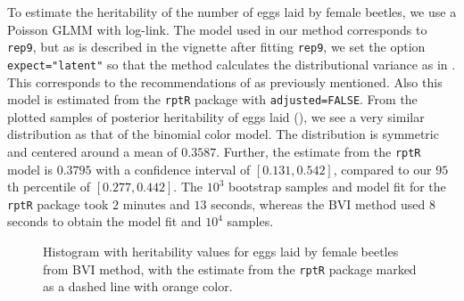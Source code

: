 \noindent To estimate the heritability of the number of eggs laid by female beetles, we use a Poisson GLMM with log-link. The model used in our method corresponds to \texttt{rep9}, but as is described in the vignette after fitting \texttt{rep9}, we set the option \texttt{expect="latent"} so that the method calculates the distributional variance as in . This corresponds to the recommendations of \citet{nakagawa2017} as previously mentioned. Also this model is estimated from the \texttt{rptR} package with \texttt{adjusted=FALSE}. From the plotted samples of posterior heritability of eggs laid (), we see a very similar distribution as that of the binomial color model. The distribution is symmetric and centered around a mean of $0.3587$. Further, the estimate from the \texttt{rptR} model is $0.3795$ with a confidence interval of $[0.131, 0.542]$, compared to our $95$th percentile of $[0.277, 0.442]$. The $10^3$ bootstrap samples and model fit for the \texttt{rptR} package took $2$ minutes and $13$ seconds, whereas the BVI method used $8$ seconds to obtain the model fit and $10^4$ samples.
\begin{figure}[H]
  \centering
  \caption{Histogram with heritability values for eggs laid by female beetles from BVI method, with the estimate from the \texttt{rptR} package marked as a dashed line with orange color.}
\end{figure}
